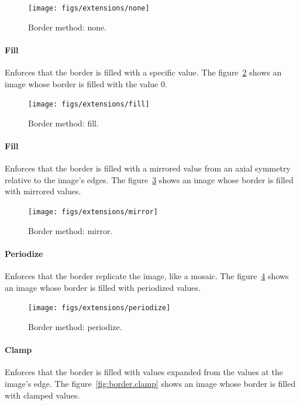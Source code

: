 \begin{figure}[tbh]
  \centering
  \texttt{[image: figs/extensions/none]}
  \caption{Border method: none.}
  \label{fig:border.none}
\end{figure}

\paragraph{Fill} Enforces that the border is filled with a specific value. The figure~\ref{fig:border.fill} shows an
image whose border is filled with the value $0$.

\begin{figure}[tbh]
  \centering
  \texttt{[image: figs/extensions/fill]}
  \caption{Border method: fill.}
  \label{fig:border.fill}
\end{figure}

\paragraph{Fill} Enforces that the border is filled with a mirrored value from an axial symmetry relative to the image's
edges. The figure~\ref{fig:border.mirror} shows an image whose border is filled with mirrored values.

\begin{figure}[tbh]
  \centering
  \texttt{[image: figs/extensions/mirror]}
  \caption{Border method: mirror.}
  \label{fig:border.mirror}
\end{figure}

\paragraph{Periodize} Enforces that the border replicate the image, like a mosaic. The
figure~\ref{fig:border.periodize} shows an image whose border is filled with periodized values.

\begin{figure}[tbh]
  \centering
  \texttt{[image: figs/extensions/periodize]}
  \caption{Border method: periodize.}
  \label{fig:border.periodize}
\end{figure}

\paragraph{Clamp} Enforces that the border is filled with values expanded from the values at the image's edge. The
figure~\ref{fig:border.clamp} shows an image whose border is filled with clamped values.

